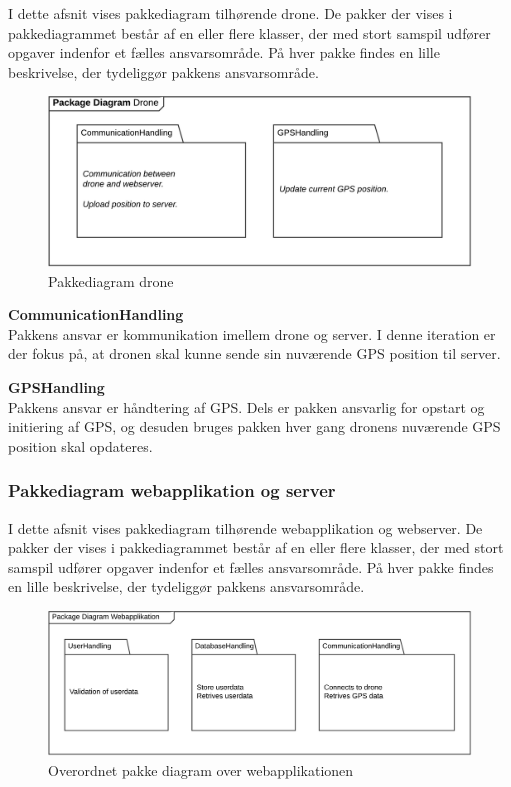 I dette afsnit vises pakkediagram tilhørende drone. De pakker der vises i pakkediagrammet består af en eller flere klasser, der med stort samspil udfører opgaver indenfor et fælles ansvarsområde. På hver pakke findes en lille beskrivelse, der tydeliggør pakkens ansvarsområde. 


\begin{figure}[H]
	\centering
	\includegraphics[width=1\textwidth]{Billeder/pakke_diagrammer/iteration1_drone.png}
	\vspace{-0.5cm}
	\caption{Pakkediagram drone}
	\label{fig:iteration1_pakke_diagram_drone}
\end{figure}

\textbf{CommunicationHandling}\\
Pakkens ansvar er kommunikation imellem drone og server. I denne iteration er der fokus på, at dronen skal kunne sende sin nuværende GPS position til server.

\textbf{GPSHandling}\\
Pakkens ansvar er håndtering af GPS. Dels er pakken ansvarlig for opstart og initiering af GPS, og desuden bruges pakken hver gang dronens nuværende GPS position skal opdateres.

\newpage
\subsubsection*{Pakkediagram webapplikation og server}

I dette afsnit vises pakkediagram tilhørende webapplikation og webserver. De pakker der vises i pakkediagrammet består af en eller flere klasser, der med stort samspil udfører opgaver indenfor et fælles ansvarsområde. På hver pakke findes en lille beskrivelse, der tydeliggør pakkens ansvarsområde. 

\begin{figure}[H]
	\centering
	\includegraphics[width=1\textwidth]{Billeder/pakke_diagrammer/iteration1_server.png}
	\vspace{-0.5cm}
	\caption{Overordnet pakke diagram over webapplikationen}
	\label{fig:iteration1_pakke_diagram_webapp}
\end{figure}

